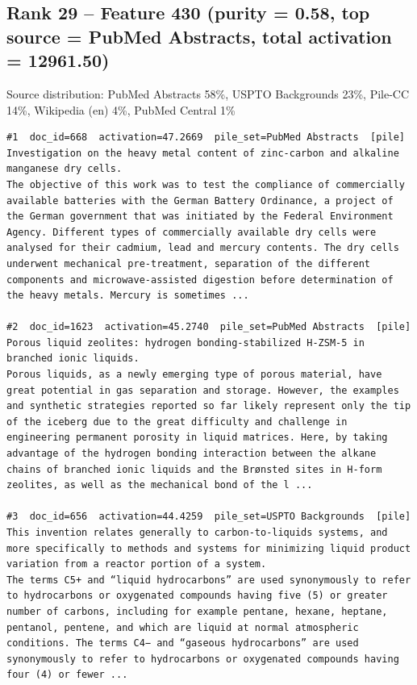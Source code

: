 \subsection*{Rank 29 -- Feature 430 (purity = 0.58, top source = PubMed Abstracts, total activation = 12961.50)}

Source distribution: PubMed Abstracts 58\%, USPTO Backgrounds 23\%, Pile-CC 14\%, Wikipedia (en) 4\%, PubMed Central 1\%

\begin{verbatim}
#1  doc_id=668  activation=47.2669  pile_set=PubMed Abstracts  [pile]
Investigation on the heavy metal content of zinc-carbon and alkaline manganese dry cells.
The objective of this work was to test the compliance of commercially available batteries with the German Battery Ordinance, a project of the German government that was initiated by the Federal Environment Agency. Different types of commercially available dry cells were analysed for their cadmium, lead and mercury contents. The dry cells underwent mechanical pre-treatment, separation of the different components and microwave-assisted digestion before determination of the heavy metals. Mercury is sometimes ...

#2  doc_id=1623  activation=45.2740  pile_set=PubMed Abstracts  [pile]
Porous liquid zeolites: hydrogen bonding-stabilized H-ZSM-5 in branched ionic liquids.
Porous liquids, as a newly emerging type of porous material, have great potential in gas separation and storage. However, the examples and synthetic strategies reported so far likely represent only the tip of the iceberg due to the great difficulty and challenge in engineering permanent porosity in liquid matrices. Here, by taking advantage of the hydrogen bonding interaction between the alkane chains of branched ionic liquids and the Brønsted sites in H-form zeolites, as well as the mechanical bond of the l ...

#3  doc_id=656  activation=44.4259  pile_set=USPTO Backgrounds  [pile]
This invention relates generally to carbon-to-liquids systems, and more specifically to methods and systems for minimizing liquid product variation from a reactor portion of a system.
The terms C5+ and “liquid hydrocarbons” are used synonymously to refer to hydrocarbons or oxygenated compounds having five (5) or greater number of carbons, including for example pentane, hexane, heptane, pentanol, pentene, and which are liquid at normal atmospheric conditions. The terms C4− and “gaseous hydrocarbons” are used synonymously to refer to hydrocarbons or oxygenated compounds having four (4) or fewer ...


\end{verbatim}
